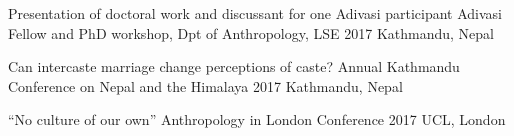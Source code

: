 \begin{cvpresentations}

  \cvpresentation
    {Presentation of doctoral work and discussant for one Adivasi participant} %
    {Adivasi Fellow and PhD workshop, Dpt of Anthropology, LSE} %
    {2017} %
    {Kathmandu, Nepal} %

  \cvpresentation
    {Can intercaste marriage change perceptions of caste?} %
    {Annual Kathmandu Conference on Nepal and the Himalaya} %
    {2017} %
    {Kathmandu, Nepal} %


  \cvpresentation
    {``No culture of our own''} %
    {Anthropology in London Conference} %
    {2017} %
    {UCL, London} %


\end{cvpresentations}
